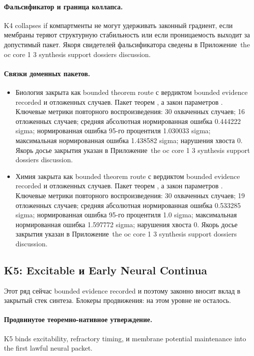 \paragraph{Фальсификатор и граница коллапса.}
K4 collapses if компартменты не могут удерживать законный градиент, если мембраны теряют структурную стабильность или если проницаемость выходит за допустимый пакет.
Якоря свидетелей фальсификатора сведены в Приложение~the oc core 1 3 synthesis support dossiers discussion.

\paragraph{Связки доменных пакетов.}
\begin{itemize}[leftmargin=1.6em,nosep]
\item Биология закрыта как bounded theorem route с вердиктом bounded evidence recorded и  отложенных случаев. Пакет теорем , а закон параметров . Ключевые метрики повторного воспроизведения: 30 охваченных случаев; 16 отложенных случаев; средняя абсолютная нормированная ошибка 0.444222 sigma; нормированная ошибка 95-го процентиля 1.030033 sigma; максимальная нормированная ошибка 1.438582 sigma; нарушения хвоста 0. Якорь досье закрытия указан в Приложение~the oc core 1 3 synthesis support dossiers discussion.
\item Химия закрыта как bounded theorem route с вердиктом bounded evidence recorded и  отложенных случаев. Пакет теорем , а закон параметров . Ключевые метрики повторного воспроизведения: 30 охваченных случаев; 19 отложенных случаев; средняя абсолютная нормированная ошибка 0.533285 sigma; нормированная ошибка 95-го процентиля 1.0 sigma; максимальная нормированная ошибка 1.597772 sigma; нарушения хвоста 0. Якорь досье закрытия указан в Приложение~the oc core 1 3 synthesis support dossiers discussion.
\end{itemize}

\subsection{K5: Excitable и Early Neural Continua}
\label{sec:oc-core-1-3-synthesis-k5}
Этот ряд сейчас bounded evidence recorded и поэтому законно вносит вклад в закрытый стек синтеза.
Блокеры продвижения: на этом уровне не осталось.

\paragraph{Продвинутое теоремно-нативное утверждение.}
K5 binds excitability, refractory timing, и membrane potential maintenance into the first lawful neural packet.

